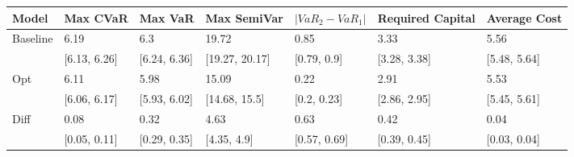 \begin{tabular}{lllllll}
\toprule
   Model &     Max CVaR &      Max VaR &    Max SemiVar & $|VaR_2 - VaR_1|$ & Required Capital & Average Cost \\
\midrule
Baseline &         6.19 &          6.3 &          19.72 &              0.85 &             3.33 &         5.56 \\
         & [6.13, 6.26] & [6.24, 6.36] & [19.27, 20.17] &       [0.79, 0.9] &     [3.28, 3.38] & [5.48, 5.64] \\
     Opt &         6.11 &         5.98 &          15.09 &              0.22 &             2.91 &         5.53 \\
         & [6.06, 6.17] & [5.93, 6.02] &  [14.68, 15.5] &       [0.2, 0.23] &     [2.86, 2.95] & [5.45, 5.61] \\
    Diff &         0.08 &         0.32 &           4.63 &              0.63 &             0.42 &         0.04 \\
         & [0.05, 0.11] & [0.29, 0.35] &    [4.35, 4.9] &      [0.57, 0.69] &     [0.39, 0.45] & [0.03, 0.04] \\
\bottomrule
\end{tabular}
